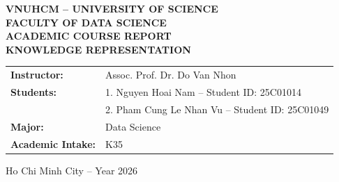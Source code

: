 \documentclass[11pt,a4paper]{report}
\begin{document}
\begin{titlepage}
    \centering
    \vspace*{0.5cm}
    {\Large\bfseries VNUHCM -- UNIVERSITY OF SCIENCE}\\[0.3cm]
    {\large\bfseries FACULTY OF DATA SCIENCE}\\[1.5cm]

    {\Large\bfseries ACADEMIC COURSE REPORT}\\[0.3cm]
    {\Huge\bfseries\color{navyblue} KNOWLEDGE REPRESENTATION}\\[0.8cm]

    \begin{center}
\end{center}

    \vspace{1.2cm}

    \begin{minipage}{0.85\textwidth}
        \large
        \begin{tabular}{ll}
            \textbf{Instructor:} & Assoc. Prof. Dr. Do Van Nhon \\[0.3cm]
            \textbf{Students:} & 1. Nguyen Hoai Nam -- Student ID: 25C01014 \\[0.15cm]
            & 2. Pham Cung Le Nhan Vu -- Student ID: 25C01049 \\[0.3cm]
            \textbf{Major:} & Data Science \\[0.15cm]
            \textbf{Academic Intake:} & K35
        \end{tabular}
    \end{minipage}

    \vfill
    {\large Ho Chi Minh City -- Year 2026}
\end{titlepage}

\setcounter{page}{1}
\end{document}
